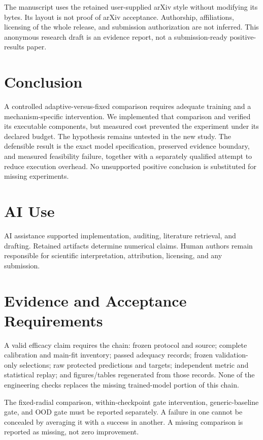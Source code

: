 \documentclass[10pt]{article}
\begin{document}
The manuscript uses the retained user-supplied arXiv style without modifying its bytes. Its layout is not proof of arXiv acceptance. Authorship, affiliations, licensing of the whole release, and submission authorization are not inferred. This anonymous research draft is an evidence report, not a submission-ready positive-results paper.

\section{Conclusion}
A controlled adaptive-versus-fixed comparison requires adequate training and a mechanism-specific intervention. We implemented that comparison and verified its executable components, but measured cost prevented the experiment under its declared budget. The hypothesis remains untested in the new study. The defensible result is the exact model specification, preserved evidence boundary, and measured feasibility failure, together with a separately qualified attempt to reduce execution overhead. No unsupported positive conclusion is substituted for missing experiments.

\section*{AI Use}
AI assistance supported implementation, auditing, literature retrieval, and drafting. Retained artifacts determine numerical claims. Human authors remain responsible for scientific interpretation, attribution, licensing, and any submission.

\appendix
\section{Evidence and Acceptance Requirements}
A valid efficacy claim requires the chain: frozen protocol and source; complete calibration and main-fit inventory; passed adequacy records; frozen validation-only selections; raw protected predictions and targets; independent metric and statistical replay; and figures/tables regenerated from those records. None of the engineering checks replaces the missing trained-model portion of this chain.

The fixed-radial comparison, within-checkpoint gate intervention, generic-baseline gate, and OOD gate must be reported separately. A failure in one cannot be concealed by averaging it with a success in another. A missing comparison is reported as missing, not zero improvement.
\end{document}
